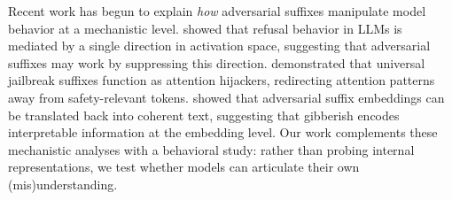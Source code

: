 Recent work has begun to explain \emph{how} adversarial suffixes manipulate model behavior at a mechanistic level. \citet{arditi2024refusal} showed that refusal behavior in LLMs is mediated by a single direction in activation space, suggesting that adversarial suffixes may work by suppressing this direction. \citet{chen2025attention} demonstrated that universal jailbreak suffixes function as attention hijackers, redirecting attention patterns away from safety-relevant tokens. \citet{wang2024noise} showed that adversarial suffix embeddings can be translated back into coherent text, suggesting that gibberish encodes interpretable information at the embedding level. Our work complements these mechanistic analyses with a behavioral study: rather than probing internal representations, we test whether models can articulate their own (mis)understanding.
